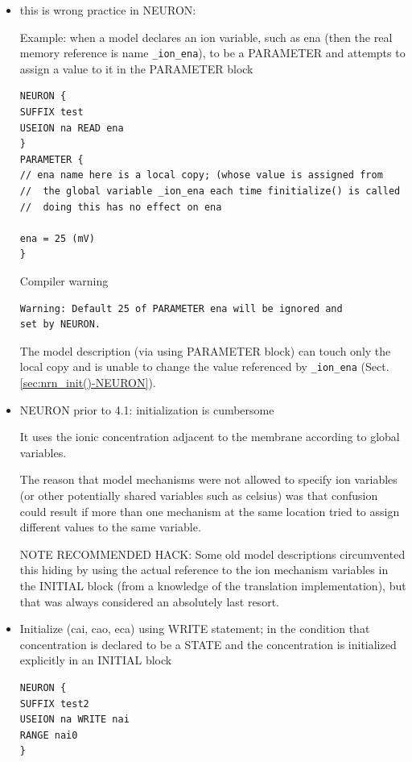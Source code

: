 \begin{itemize}

   \item this is wrong practice in NEURON:
     
Example:  when a model declares an ion variable, such as ena (then the real
memory reference is name \verb!_ion_ena!), to be a PARAMETER and attempts to
assign a value to it in the PARAMETER block
  
\begin{verbatim}
NEURON {
SUFFIX test
USEION na READ ena
}
PARAMETER { 
// ena name here is a local copy; (whose value is assigned from
//  the global variable _ion_ena each time finitialize() is called 
//  doing this has no effect on ena

ena = 25 (mV)
}
\end{verbatim}
Compiler warning
\begin{verbatim}
Warning: Default 25 of PARAMETER ena will be ignored and
set by NEURON.
\end{verbatim} 

The model description (via using PARAMETER block) can touch only the local copy
and is unable to change the value referenced by \verb!_ion_ena!
(Sect.\ref{sec:nrn_init()-NEURON}).
  
  \item NEURON prior to 4.1: initialization is cumbersome
  
  It uses the ionic concentration adjacent to the membrane according to global
  variables.
  
  The reason that model mechanisms were not allowed to specify ion variables (or
  other potentially shared variables such as celsius) was that confusion could
  result if more than one mechanism at the same location tried to assign
  different values to the same variable.
  

 
NOTE RECOMMENDED HACK: Some old model descriptions circumvented this hiding by
using the actual reference to the ion mechanism variables in the INITIAL block
(from a knowledge of the translation implementation), but that was always
considered an absolutely last resort.
  
  
  \item Initialize (cai, cao, eca)	using WRITE statement; in the condition that 
  concentration is declared to be a STATE and the concentration is initialized
  explicitly in an INITIAL block
  
\begin{verbatim}
NEURON {
SUFFIX test2
USEION na WRITE nai
RANGE nai0
}


\end{verbatim}
\end{itemize}
